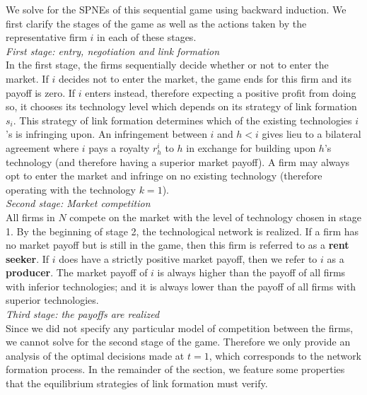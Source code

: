 \documentclass{article}
\begin{document}
\indent We solve for the SPNEs of this sequential game using backward induction. We first clarify the stages of the game as well as the actions taken by the representative firm $i$ in each of these stages. \\

\textit{First stage: entry, negotiation and link formation }\\

\indent In the first stage, the firms sequentially decide whether or not to enter the market. If $i$ decides not to enter the market, the game ends for this firm and its payoff is zero. If $i$ enters instead, therefore expecting a positive profit from doing so, it chooses its technology level which depends on its strategy of link formation $s_i$. This strategy of link formation determines which of the existing technologies $i$'s is infringing upon. An infringement between $i$ and $h<i$ gives lieu to a bilateral agreement where $i$ pays a royalty $r^i_h$ to $h$ in exchange for building upon $h$'s technology (and therefore having a superior market payoff). A firm may always opt to enter the market and infringe on no existing technology (therefore operating with the technology $k=1$). \\

\textit{Second stage: Market competition}\\

\indent All firms in $N$ compete on the market with the level of technology chosen in stage 1. By the beginning of stage 2, the technological network  is realized. If a firm has no market payoff but is still in the game, then this firm is referred to as a \textbf{rent seeker}. If $i$ does have a strictly positive market payoff, then we refer to $i$ as a \textbf{producer}. The market payoff of $i$ is always higher than the payoff of all firms with inferior technologies; and it is always lower than the payoff of all firms with superior technologies. \\

\textit{Third stage: the payoffs are realized}\\

\indent Since we did not specify any particular model of competition between the firms, we cannot solve for the second stage of the game. Therefore we only provide an analysis of the optimal decisions made at $t=1$, which corresponds to the network formation process. In the remainder of the section, we feature some properties that the equilibrium strategies of link formation must verify.  \\
\end{document}
